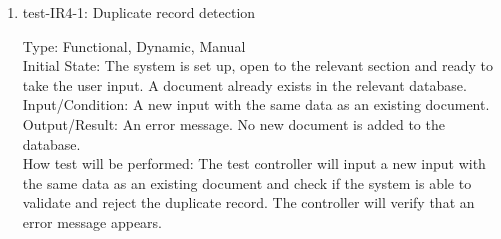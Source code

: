 \documentclass[12pt, titlepage]{article}
\begin{document}
\begin{enumerate}
    

    \item{test-IR4-1}: Duplicate record detection \label{test-IR4-1}
    
    Type: Functional, Dynamic, Manual\\
    
    Initial State: The system is set up, open to the relevant section and ready to take the user input. A document already exists in the relevant database.\\
    
    Input/Condition: A new input with the same data as an existing document.\\
    
    Output/Result: An error message. No new document is added to the database.\\
    
    How test will be performed: The test controller will input a new input with the same data as an existing document and check if the system is able to validate and reject the duplicate record. The controller will verify that an error message appears.

    
    
    
    
    


\end{enumerate}
\end{document}
